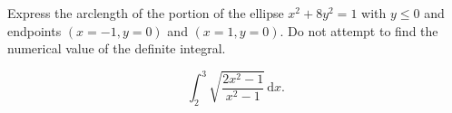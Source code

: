\documentclass[12pt,fleqn]{exam}
\begin{document}
\begin{questions}
\question[5] Express the arclength of the portion of the ellipse $x^2 +  8 y^2 = 1$ with $y \leq 0$ and endpoints 
$(x=-1, y=0)$ and $(x=1, y = 0)$. Do not
attempt to find the numerical value of the definite integral.
\begin{solution}[2.5in]
\[\int_{2}^{3}{\left. \sqrt{\frac{2 {{x}^{2}}-1}{{{x}^{2}}-1}} \, \mathrm{d} x\right.}.\]
\end{solution}



\end{questions}
%     
\end{document}
